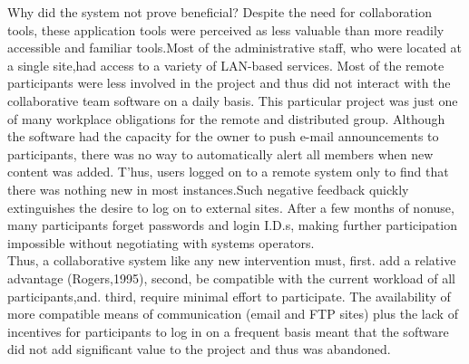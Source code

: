 \documentclass[a4paper,12pt]{article}
\begin{document}
	Why did the system not prove beneficial? Despite the need for collaboration tools, these application tools were perceived as less valuable than more readily accessible and familiar tools.Most of the administrative staff, who were located at a single site,had access to a variety of LAN-based services. Most of the remote participants were less involved in the project and thus did not interact with the collaborative team software on a daily basis. This particular project was just one of many workplace obligations for the remote and distributed group. Although the software had the capacity for the owner to push e-mail announcements to participants, there was no way to automatically alert all members when new content was added. T'hus, users logged on to a remote system only to find that there was nothing new in most instances.Such negative feedback quickly extinguishes the desire to log on to external sites. After a few months of nonuse, many participants forget passwords and login I.D.s, making further participation impossible without negotiating with systems operators.\\
	Thus, a collaborative system like any new intervention must, first. add a relative
	advantage (Rogers,1995), second, be compatible with the current workload of all participants,and. third, require minimal effort to participate. The availability of more compatible means of communication (email and FTP sites) plus the lack of incentives for participants to log in on a frequent basis meant that the software did not add significant value to the project and thus was abandoned.\\
	\\
\end{document}
